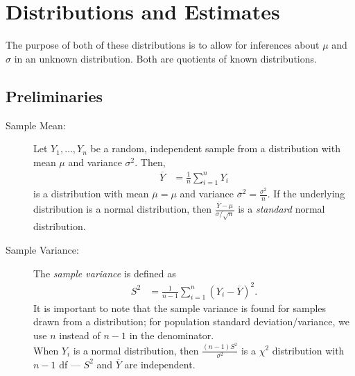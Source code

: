 \documentclass[10pt]{extarticle}
\title{}
\author{}
\date{}
\begin{document}
\section{Distributions and Estimates}%
  The purpose of both of these distributions is to allow for inferences about $\mu$ and $\sigma$ in an unknown distribution. Both are quotients of known distributions.\\
\subsection{Preliminaries}%
  \begin{description}
    \item[Sample Mean:] Let $Y_1,\dots,Y_n$ be a random, independent sample from a distribution with mean $\mu$ and variance $\sigma^2$. Then,
      \begin{align*}
        \overline{Y} &= \frac{1}{n}\sum_{i=1}^{n}Y_i \tag*{Sample Mean}
      \end{align*}
      is a distribution with mean $\overline{\mu} = \mu$ and variance $\overline{\sigma}^2 = \frac{\sigma^2}{n}$. If the underlying distribution is a normal distribution, then $\frac{\overline{Y}-\mu}{\sigma/\sqrt{n}}$ is a \textit{standard} normal distribution.
    \item[Sample Variance:] The \textit{sample variance} is defined as
      \begin{align*}
        S^2 &= \frac{1}{n-1}\sum_{i=1}^{n}(Y_i-\overline{Y})^2.\tag*{Sample Variance}
      \end{align*}
      It is important to note that the sample variance is found for samples drawn from a distribution; for population standard deviation/variance, we use $n$ instead of $n-1$ in the denominator.\\

      When $Y_i$ is a normal distribution, then $\frac{(n-1)S^2}{\sigma^2}$ is a $\chi^2$ distribution with $n-1$ df --- $S^2$ and $\overline{Y}$ are independent.
  \end{description}
\end{document}
